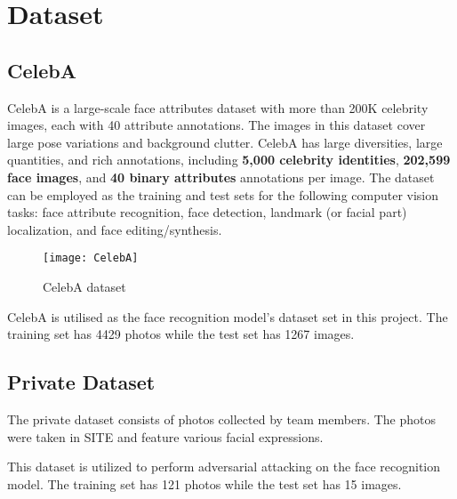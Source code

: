 \section{Dataset}

\subsection{CelebA}

CelebA is a large-scale face attributes dataset with more than 200K celebrity images, each with 40 attribute annotations. The images in this dataset cover large pose variations and background clutter. CelebA has large diversities, large quantities, and rich annotations, including \textbf{5,000 celebrity identities}, \textbf{202,599 face images}, and \textbf{40 binary attributes} annotations per image. The dataset can be employed as the training and test sets for the following computer vision tasks: face attribute recognition, face detection, landmark (or facial part) localization, and face editing/synthesis.

\begin{figure}[h]
\centering
\texttt{[image: CelebA]}
\caption{CelebA dataset}
\label{fig:CelebA}
\end{figure}

CelebA is utilised as the face recognition model's dataset set in this project. The training set has 4429 photos while the test set has 1267 images.

\subsection{Private Dataset}

The private dataset consists of photos collected by team members. The photos were taken in SITE and feature various facial expressions.

This dataset is utilized to perform adversarial attacking on the face recognition model. The training set has 121 photos while the test set has 15 images.

